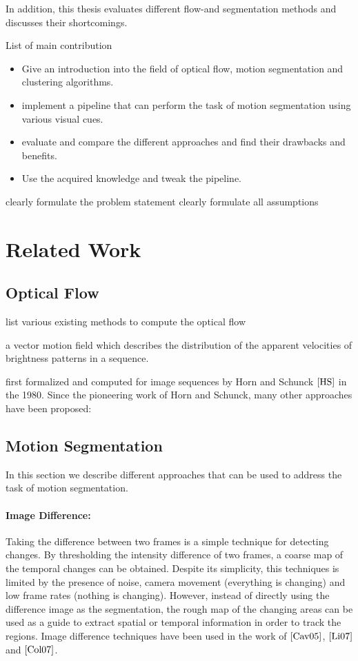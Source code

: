 In addition, this thesis evaluates different flow-and segmentation methods and discusses their shortcomings.

List of main contribution

\begin{itemize}
  \item Give an introduction into the field of optical flow, motion segmentation and clustering algorithms.
  \item implement a pipeline that can perform the task of motion segmentation using various visual cues.
  \item evaluate and compare the different approaches and find their drawbacks and benefits.
  \item Use the acquired knowledge and tweak the pipeline.
\end{itemize}


clearly formulate the problem statement
clearly formulate all assumptions

\section{Related Work}

\subsection{Optical Flow}
list various existing methods to compute the optical flow

a vector motion field which describes the distribution of the apparent velocities of brightness patterns in a sequence. 

first formalized and computed  for  image  sequences  by  Horn  and  Schunck $\cite{HS}$ in  the  1980. Since the pioneering work of Horn and Schunck, many other approaches have been proposed:

\subsection{Motion Segmentation}
In this section we describe different approaches that can be used to address the task of motion segmentation.

\paragraph{Image Difference:} Taking the difference between two frames is a simple technique for detecting changes. By thresholding the intensity difference of two frames, a coarse map of the temporal changes can be obtained. Despite its simplicity, this techniques is limited by the presence of noise, camera movement (everything is changing) and low frame rates (nothing is changing). However, instead of directly using the difference image as the segmentation, the rough map of the changing areas can be used as a guide to extract spatial or temporal information in order to track the regions. Image difference techniques have been used in the work of $\cite{Cav05}$, $\cite{Li07}$ and $\cite{Col07}$.

